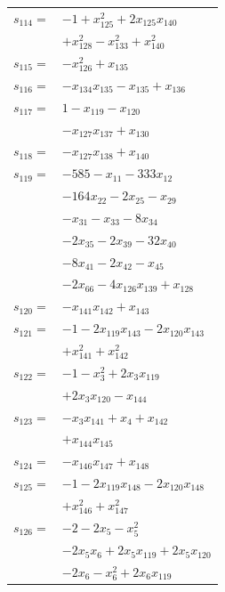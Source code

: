 \begin{longtable}{@{}r@{\;}l@{}}
\(s_{114}=\) & \(\displaystyle -1 +x_{125}^{2} +2x_{125}x_{140}\) \\
 & \(\displaystyle +x_{128}^{2} -x_{133}^{2} +x_{140}^{2}\) \\[3pt]
\(s_{115}=\) & \(\displaystyle -x_{126}^{2} +x_{135}\) \\[3pt]
\(s_{116}=\) & \(\displaystyle -x_{134}x_{135} -x_{135} +x_{136}\) \\[3pt]
\(s_{117}=\) & \(\displaystyle 1 -x_{119} -x_{120}\) \\
 & \(\displaystyle -x_{127}x_{137} +x_{130}\) \\[3pt]
\(s_{118}=\) & \(\displaystyle -x_{127}x_{138} +x_{140}\) \\[3pt]
\(s_{119}=\) & \(\displaystyle -585 -x_{11} -333x_{12}\) \\
 & \(\displaystyle -164x_{22} -2x_{25} -x_{29}\) \\
 & \(\displaystyle -x_{31} -x_{33} -8x_{34}\) \\
 & \(\displaystyle -2x_{35} -2x_{39} -32x_{40}\) \\
 & \(\displaystyle -8x_{41} -2x_{42} -x_{45}\) \\
 & \(\displaystyle -2x_{66} -4x_{126}x_{139} +x_{128}\) \\[3pt]
\(s_{120}=\) & \(\displaystyle -x_{141}x_{142} +x_{143}\) \\[3pt]
\(s_{121}=\) & \(\displaystyle -1 -2x_{119}x_{143} -2x_{120}x_{143}\) \\
 & \(\displaystyle +x_{141}^{2} +x_{142}^{2}\) \\[3pt]
\(s_{122}=\) & \(\displaystyle -1 -x_{3}^{2} +2x_{3}x_{119}\) \\
 & \(\displaystyle +2x_{3}x_{120} -x_{144}\) \\[3pt]
\(s_{123}=\) & \(\displaystyle -x_{3}x_{141} +x_{4} +x_{142}\) \\
 & \(\displaystyle +x_{144}x_{145}\) \\[3pt]
\(s_{124}=\) & \(\displaystyle -x_{146}x_{147} +x_{148}\) \\[3pt]
\(s_{125}=\) & \(\displaystyle -1 -2x_{119}x_{148} -2x_{120}x_{148}\) \\
 & \(\displaystyle +x_{146}^{2} +x_{147}^{2}\) \\[3pt]
\(s_{126}=\) & \(\displaystyle -2 -2x_{5} -x_{5}^{2}\) \\
 & \(\displaystyle -2x_{5}x_{6} +2x_{5}x_{119} +2x_{5}x_{120}\) \\
 & \(\displaystyle -2x_{6} -x_{6}^{2} +2x_{6}x_{119}\) \\

\end{longtable}
